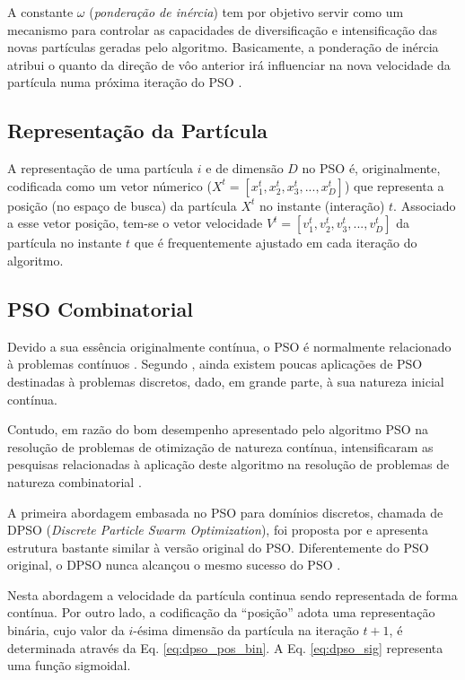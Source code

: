 \documentclass[
	12pt,				%
	openany,			%
	oneside,	
	a4paper,			%
	brazil,				%
	]{unimontes-ppgmsc-abntex2}
\begin{document}
A constante $\omega$ ({\em ponderação de inércia}) tem por objetivo servir como um mecanismo para controlar as capacidades de diversificação e intensificação das novas partículas geradas pelo algoritmo. Basicamente, a ponderação de inércia atribui o quanto da direção de vôo anterior irá influenciar na nova velocidade da partícula numa próxima iteração do PSO \cite{Rini_2011}.

\subsection{Representação da Partícula}
\label{sec:repr_part}

A representação de uma partícula $i$ e de dimensão $D$ no PSO é, originalmente, codificada como um vetor númerico ($X^t =[x^t_1, x^t_2, x^t_3, ... ,x^t_D]$) que representa a posição (no espaço de busca) da partícula $X^t$ no instante (interação) $t$. Associado a esse vetor posição, tem-se o vetor velocidade $V^t =[v^t_1, v^t_2, v^t_3, ... , v^t_D]$ da partícula no instante $t$ que é frequentemente ajustado em cada iteração do algoritmo.

\subsection{PSO Combinatorial}
\label{sec:pso_discretos}

Devido a sua essência originalmente contínua, o PSO é normalmente relacionado à problemas contínuos \cite{Kennedy_1997}. Segundo , ainda existem poucas aplicações de PSO destinadas à problemas discretos, dado, em grande parte, à sua natureza inicial contínua. 

Contudo, em razão do bom desempenho apresentado pelo algoritmo PSO na resolução de problemas de otimização de natureza contínua, intensificaram as pesquisas relacionadas à aplicação deste algoritmo na resolução de problemas de natureza combinatorial \cite{Wang2_2011}. 

A primeira abordagem embasada no PSO para domínios discretos, chamada de DPSO (\textit{Discrete Particle Swarm Optimization}), foi proposta por  e apresenta estrutura bastante similar à versão original do PSO. Diferentemente do PSO original, o DPSO nunca alcançou o mesmo sucesso do PSO \cite{Hoffmann_2011}. 

Nesta abordagem a velocidade da partícula continua sendo representada de forma contínua. Por outro lado, a codificação da ``posição'' adota uma representação binária, cujo valor da $i$-ésima dimensão da partícula na iteração $t+1$, é determinada através da Eq. \ref{eq:dpso_pos_bin}. A Eq. \ref{eq:dpso_sig} representa uma função sigmoidal.
\end{document}
